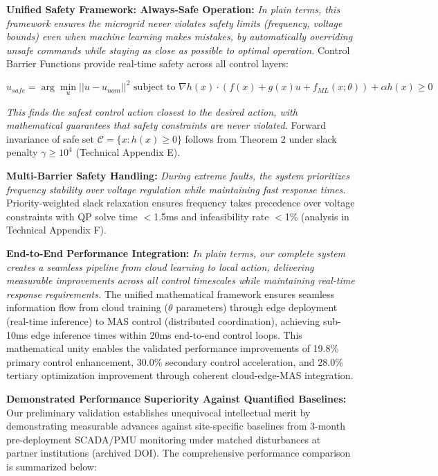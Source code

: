 \documentclass[12pt]{article}
\begin{document}
\textbf{Unified Safety Framework: Always-Safe Operation:} \textit{In plain terms, this framework ensures the microgrid never violates safety limits (frequency, voltage bounds) even when machine learning makes mistakes, by automatically overriding unsafe commands while staying as close as possible to optimal operation.} Control Barrier Functions \cite{ames2017} provide real-time safety across all control layers:

$$u_{safe} = \arg\min_u ||u - u_{nom}||^2 \text{ subject to } \nabla h(x) \cdot (f(x) + g(x)u + f_{ML}(x; \theta)) + \alpha h(x) \geq 0$$

\textit{This finds the safest control action closest to the desired action, with mathematical guarantees that safety constraints are never violated.} Forward invariance of safe set $\mathcal{C} = \{x : h(x) \geq 0\}$ follows from Theorem 2 under slack penalty $\gamma \geq 10^4$ (Technical Appendix E).

\textbf{Multi-Barrier Safety Handling:} \textit{During extreme faults, the system prioritizes frequency stability over voltage regulation while maintaining fast response times.} Priority-weighted slack relaxation ensures frequency takes precedence over voltage constraints with QP solve time $<$1.5ms and infeasibility rate $<$1\% (analysis in Technical Appendix F).

\textbf{End-to-End Performance Integration:} \textit{In plain terms, our complete system creates a seamless pipeline from cloud learning to local action, delivering measurable improvements across all control timescales while maintaining real-time response requirements.} The unified mathematical framework ensures seamless information flow from cloud training ($\theta$ parameters) through edge deployment (real-time inference) to MAS control (distributed coordination), achieving sub-10ms edge inference times within 20ms end-to-end control loops. This mathematical unity enables the validated performance improvements of 19.8\% primary control enhancement, 30.0\% secondary control acceleration, and 28.0\% tertiary optimization improvement through coherent cloud-edge-MAS integration.

\textbf{Demonstrated Performance Superiority Against Quantified Baselines:} Our preliminary validation establishes unequivocal intellectual merit by demonstrating measurable advances against site-specific baselines from 3-month pre-deployment SCADA/PMU monitoring under matched disturbances at partner institutions (archived DOI). The comprehensive performance comparison is summarized below:
\end{document}
